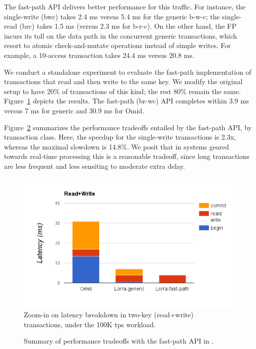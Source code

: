 The fast-path API delivers better performance for this traffic. For instance, the single-write (bwc) takes 2.4 ms versus 
5.4 ms for the generic b-w-c; the single-read (brc) takes 1.5 ms (versus 2.3 ms for b-r-c). On the other hand, the FP incurs 
its toll on the data path in the concurrent generic transactions, which resort to atomic check-and-mutate operations instead
of simple writes. For example, a 10-access transaction takes 24.4 ms versus 20.8 ms. 

We conduct a standalone experiment to evaluate the fast-path implementation of transactions that read and then write 
to the same key. We modify the original setup to have 20\% of transactions of this kind; the rest 80\% remain the same.
Figure~\ref{fig:rmw} depicts the results. The fast-path (br-wc) API completes within 3.9 ms versus 7 ms for generic {\sys\/} 
and 30.9 ms for Omid. 

Figure~\ref{fig:fp-tradeoff} summarizes the performance tradeoffs entailed by the fast-path API, by transaction class. 
Here, the speedup for the single-write transactions is 2.3x, whereas the maximal slowdown is 14.8\%. We posit that 
in systems geared towards real-time processing this is a reasonable tradeoff, since long transactions are less frequent
and less sensiting to moderate extra delay. 

\begin{figure}[t]
\includegraphics[width=.5\textwidth]{figs/stack-br-wc.png}
\caption{Zoom-in on latency breakdown in two-key (read+write) transactions, 
under the 100K tps workload.}
\label{fig:rmw}
\end{figure}

\begin{figure}
\caption{Summary of performance tradeoffs with the fast-path API in {\sys}.}
\label{fig:fp-tradeoff}
\end{figure}

